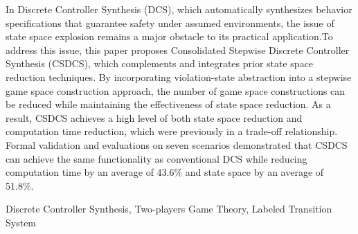 \documentclass[submit]{ipsj}
\begin{document}
\begin{eabstract}

In Discrete Controller Synthesis (DCS), which automatically synthesizes behavior specifications that guarantee safety under assumed environments, the issue of state space explosion remains a major obstacle to its practical application.To address this issue, this paper proposes Consolidated Stepwise Discrete Controller Synthesis (CSDCS), which complements and integrates prior state space reduction techniques. By incorporating violation-state abstraction into a stepwise game space construction approach, the number of game space constructions can be reduced while maintaining the effectiveness of state space reduction. As a result, CSDCS achieves a high level of both state space reduction and computation time reduction, which were previously in a trade-off relationship. Formal validation and evaluations on seven scenarios demonstrated that CSDCS can achieve the same functionality as conventional DCS while reducing computation time by an average of 43.6\% and state space by an average of 51.8\%.
\end{eabstract}
\begin{ekeyword}
Discrete Controller Synthesis, Two-players Game Theory, Labeled Transition System
\end{ekeyword}

\maketitle
\end{document}

